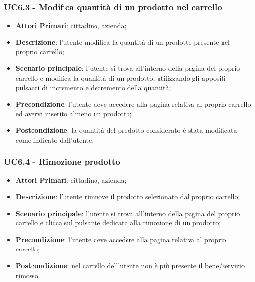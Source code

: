 \subsubsection{UC6.3 - Modifica quantità di un prodotto nel carrello}
\begin{itemize}
	\item \textbf{Attori Primari}: cittadino, azienda;
	\item \textbf{Descrizione}: l'utente modifica la quantità di un prodotto presente nel proprio carrello;
	\item \textbf{Scenario principale}: l'utente si trova all'interno della pagina del proprio carrello e modifica la quantità di un prodotto, utilizzando gli appositi pulsanti di incremento e decremento della quantità;
	\item \textbf{Precondizione}: l'utente deve accedere alla pagina relativa al proprio carrello ed avervi inserito almeno un prodotto;
	\item \textbf{Postcondizione}: la quantità del prodotto considerato è stata modificata come indicato dall'utente.
\end{itemize}

\subsubsection{UC6.4 - Rimozione prodotto}
\begin{itemize}
	\item \textbf{Attori Primari}: cittadino, azienda;
	\item \textbf{Descrizione}: l'utente rimuove il prodotto selezionato dal proprio carrello;
	\item \textbf{Scenario principale}: l'utente si trova all'interno della pagina del proprio carrello e clicca sul pulsante dedicato alla rimozione di un prodotto;
	\item \textbf{Precondizione}: l'utente deve accedere alla pagina relativa al proprio carrello;
	\item \textbf{Postcondizione}: nel carrello dell'utente non è più presente il bene/servizio rimosso.
\end{itemize}